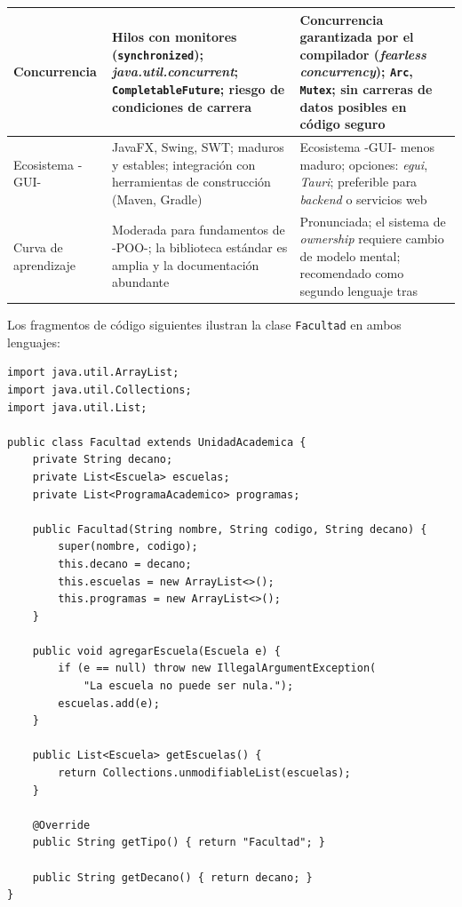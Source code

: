 \begin{longtable}{L{2.8cm} L{5.5cm} L{5.5cm}}
	Concurrencia
	& Hilos con monitores (\texttt{synchronized}); \textit{java.util.concurrent}; \texttt{CompletableFuture}; riesgo de condiciones de carrera
	& Concurrencia garantizada por el compilador (\textit{fearless concurrency}); \texttt{Arc}, \texttt{Mutex}; sin carreras de datos posibles en código seguro \\
	\midrule
	
	Ecosistema -GUI-
	& JavaFX, Swing, SWT; maduros y estables; integración con herramientas de construcción (Maven, Gradle)
	& Ecosistema -GUI- menos maduro; opciones: \textit{egui}, \textit{Tauri}; preferible para \textit{backend} o servicios web \\
	\midrule
	
	Curva de aprendizaje
	& Moderada para fundamentos de -POO-; la biblioteca estándar es amplia y la documentación abundante
	& Pronunciada; el sistema de \textit{ownership} requiere cambio de modelo mental; recomendado como segundo lenguaje tras \java \\
\end{longtable}
\endgroup

Los fragmentos de código siguientes ilustran la clase \texttt{Facultad}
en ambos lenguajes:

\begin{lstlisting}[style=javaStyle,
  caption={Clase \texttt{Facultad} en \java\ (versión simplificada).},
  label={lst:java-facultad}]
import java.util.ArrayList;
import java.util.Collections;
import java.util.List;

public class Facultad extends UnidadAcademica {
    private String decano;
    private List<Escuela> escuelas;
    private List<ProgramaAcademico> programas;

    public Facultad(String nombre, String codigo, String decano) {
        super(nombre, codigo);
        this.decano = decano;
        this.escuelas = new ArrayList<>();
        this.programas = new ArrayList<>();
    }

    public void agregarEscuela(Escuela e) {
        if (e == null) throw new IllegalArgumentException(
            "La escuela no puede ser nula.");
        escuelas.add(e);
    }

    public List<Escuela> getEscuelas() {
        return Collections.unmodifiableList(escuelas);
    }

    @Override
    public String getTipo() { return "Facultad"; }

    public String getDecano() { return decano; }
}
\end{lstlisting}

